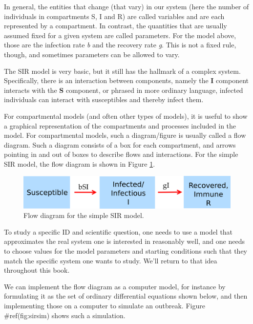 \documentclass[]{book}
\theoremstyle{definition}
\theoremstyle{definition}
\theoremstyle{definition}
\theoremstyle{remark}
\begin{document}
In general, the entities that change (that vary) in our system (here the
number of individuals in compartments S, I and R) are called variables
and are each represented by a compartment. In contrast, the quantities
that are usually assumed fixed for a given system are called parameters.
For the model above, those are the infection rate \emph{b} and the
recovery rate \emph{g}. This is not a fixed rule, though, and sometimes
parameters can be allowed to vary.

The SIR model is very basic, but it still has the hallmark of a complex
system. Specifically, there is an interaction between components, namely
the \textbf{I} component interacts with the \textbf{S} component, or
phrased in more ordinary language, infected individuals can interact
with susceptibles and thereby infect them.

For compartmental models (and often other types of models), it is useful
to show a graphical representation of the compartments and processes
included in the model. For compartmental models, such a diagram/figure
is usually called a flow diagram. Such a diagram consists of a box for
each compartment, and arrows pointing in and out of boxes to describe
flows and interactions. For the simple SIR model, the flow diagram is
shown in Figure \ref{fig:basicSIR}.

\begin{figure}
\centering
\includegraphics{./images/basicSIRmodelfigure.png}
\caption{\label{fig:basicSIR}Flow diagram for the simple SIR model.}
\end{figure}

To study a specific ID and scientific question, one needs to use a model
that approximates the real system one is interested in reasonably well,
and one needs to choose values for the model parameters and starting
conditions such that they match the specific system one wants to study.
We'll return to that idea throughout this book.

We can implement the flow diagram as a computer model, for instance by
formulating it as the set of ordinary differential equations shown
below, and then implementing those on a computer to simulate an
outbreak. Figure \#ref(fig:sirsim) shows such a simulation.
\end{document}

